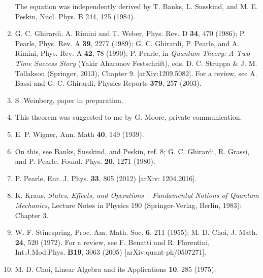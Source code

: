 \documentclass[12pt]{article}
\begin{document}
\begin{enumerate}
The equation was independently derived by T. Banks, L. Susskind, and M. E. Peskin, Nucl. Phys. B 244, 125 (1984).
\item G. C. Ghirardi, A. Rimini  
and T. Weber, Phys. Rev. D {\bf 34}, 470 (1986);  P. Pearle, Phys. Rev. A {\bf 39}, 2277 (1989);  G. C. Ghirardi, P. Pearle, and A. Rimini, Phys. Rev. A {\bf 42}, 78 (1990); P. Pearle, in {\em Quantum Theory: A Two-Time Success Story} (Yakir Aharonov Festschrift), eds. D. C. Struppa \& J. M. Tollakson (Springer, 2013), Chapter 9. [arXiv:1209.5082].  For a review, see A. Bassi and G. C. Ghirardi, Physics Reports {\bf 379}, 257 (2003).
\item S. Weinberg, paper in preparation.
\item This theorem was suggested to me by G. Moore, private communication.
\item E. P. Wigner, Ann. Math {\bf 40}, 149 (1939).
\item On this, see Banks, Susskind, and Peskin, ref. 8; G. C. Ghirardi, R. Grassi, and P. Pearle, Found. Phys. {\bf 20}, 1271 (1980).
\item P. Pearle, Eur. J. Phys. {\bf 33}, 805 (2012) [arXiv: 1204.2016].
\item K. Kraus, {\em States, Effects, and Operations -- Fundamental Notions of Quantum Mechanics}, Lecture Notes in Physics 190 (Springer-Verlag, Berlin, 1983): Chapter 3. 
\item W. F. Stinespring, Proc. Am. Math. Soc. {\bf 6}, 211 (1955); M. D. Choi, J. Math. {\bf 24}, 520 (1972).  For a review, see F. Benatti and R. Florentini,  Int.J.Mod.Phys. {\bf B19}, 3063 (2005) [arXiv:quant-ph/0507271].
\item M. D. Choi, Linear Algebra and its Applications {\bf 10}, 285 (1975).
 
\end{enumerate}
\end{document}
